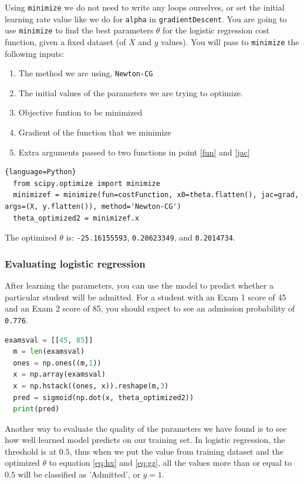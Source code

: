 \documentclass[12pt]{article}
\begin{document}
Using \texttt{minimize} we do not need to write any loops ourselves, or set the initial learning rate value like we do for \texttt{alpha} in \texttt{gradientDescent}. You are going to use \texttt{minimize} to find the best parameters $\theta$ for the logistic regression cost function, given a fixed dataset (of $X$ and $y$ values). You will pass to \texttt{minimize} the following inputs:

\begin{enumerate}
  \item The method we are using, \texttt{Newton-CG}
  \item The initial values of the parameters we are trying to optimize.
  \item Objective funtion to be minimized \label{fun}
  \item Gradient of the function that we minimize \label{jac}
  \item Extra arguments passed to two functions in point \ref{fun} and \ref{jac}
\end{enumerate}


\begin{lstlisting}{language=Python}
  from scipy.optimize import minimize
  minimizef = minimize(fun=costFunction, x0=theta.flatten(), jac=grad, args=(X, y.flatten()), method='Newton-CG')
  theta_optimized2 = minimizef.x
\end{lstlisting}

The optimized $\theta$ is: \texttt{-25.16155593}, \texttt{0.20623349}, and \texttt{0.2014734}.

\subsubsection{Evaluating logistic regression} \label{chap:eval}

After learning the parameters, you can use the model to predict whether a particular student will be admitted. For a student with an Exam 1 score of 45 and an Exam 2 score of 85, you should expect to see an admission probability of \texttt{0.776}.

\begin{lstlisting}[language=Python]
  examsval = [[45, 85]]
  m = len(examsval)
  ones = np.ones((m,1))
  x = np.array(examsval)
  x = np.hstack((ones, x)).reshape(m,3)
  pred = sigmoid(np.dot(x, theta_optimized2))
  print(pred)
\end{lstlisting}

Another way to evaluate the quality of the parameters we have found is to see how well learned model predicts on our training set. In logistic regression, the threshold is at $0.5$, thus when we put the value from training dataset and the optimized $\theta$ to equation \ref{eq:hx} and \ref{eq:gz}, all the values more than or equal to $0.5$ will be classified as 'Admitted', or $y=1$.
\end{document}
